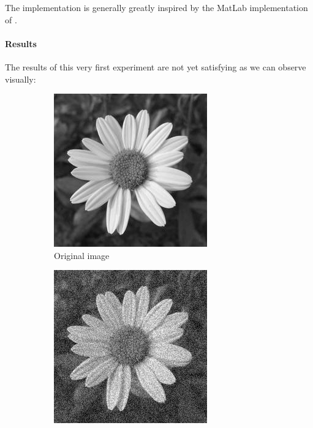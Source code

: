 The implementation is generally greatly inspired by the MatLab implementation of \cite{glide_2014}.

\paragraph{Results}
The results of this very first experiment are not yet satisfying as we can observe visually:

\begin{figure}[H]
    \centering
    \begin{subfigure}[b]{0.32\textwidth}
        \includegraphics[width=\textwidth]{img/flowerOriginal.png}
        \caption{Original image}
    \end{subfigure}
    \begin{subfigure}[b]{0.32\textwidth}
        \includegraphics[width=\textwidth]{img/flowerNoisy.png}

\end{subfigure}
\end{figure}
